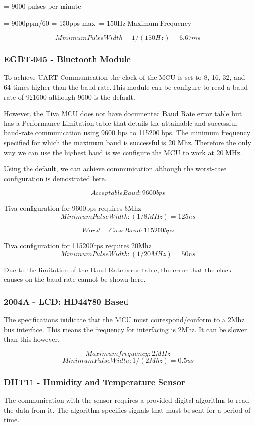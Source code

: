 				= 9000 pulses per minute
			
				= 9000ppm/60 = 150pps max. = 150Hz Maximum Frequency

			$$Minimum Pulse Width = 1/(150Hz) = 6.67 ms$$


		\subsubsection{EGBT-045 - Bluetooth Module}
			To achieve UART Communication the clock of the MCU is set to 8, 16, 32, and 64 times higher than the baud rate.This module can be configure to read a baud rate of 921600 although 9600 is the default. 

			However, the Tiva MCU does not have documented Baud Rate error table but has a Performance Limitation table that details the attainable and successful baud-rate communication using 9600 bps to 115200 bps. The minimum frequency specified for which the maximum baud is successful is 20 Mhz. Therefore the only way we can use the highest baud is we configure the MCU to work at 20 MHz.

			Using the default, we can achieve communication although the worst-case configuration is demostrated here.

			$$ Acceptable Baud: 9600bps $$
			
				Tiva configuration for 9600bps requires 8Mhz
			$$ Minimum Pulse Width: (1/8MHz) = 125 ns $$

			$$ Worst-Case Baud: 115200bps $$
			
				Tiva configuration for 115200bps requires 20Mhz
			$$ Minimum Pulse Width: (1/20MHz) = 50 ns $$

			Due to the limitation of the Baud Rate error table, the error that the clock causes on the baud rate cannot be shown here.

		\subsubsection{2004A - LCD: HD44780 Based}
			The specifications inidicate that the MCU must correspond/conform to a 2Mhz bus interface. This means the frequency for interfacing is 2Mhz. It can be slower than this however.

				$$ Maximum frequency: 2 MHz $$
				$$ Minimum Pulse Width: 1/(2Mhz)= 0.5 us $$


		\subsubsection{DHT11 - Humidity and Temperature Sensor}
			The communication with the sensor requires a provided digital algorithm to read the data from it. The algorithm specifies signals that must be sent for a period of time.

